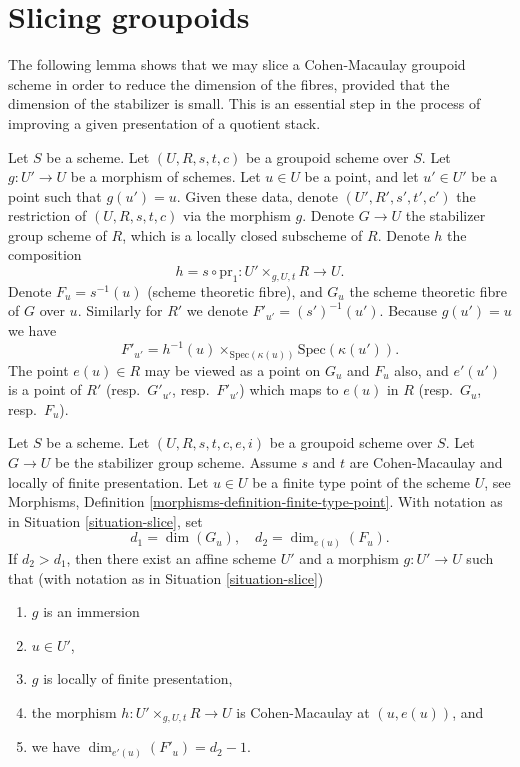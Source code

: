 \section{Slicing groupoids}
\label{section-slicing}

\noindent
The following lemma shows that we may slice a Cohen-Macaulay groupoid scheme
in order to reduce the dimension of the fibres, provided that the
dimension of the stabilizer is small. This is an essential step in
the process of improving a given presentation of a quotient stack.

\begin{situation}
\label{situation-slice}
Let $S$ be a scheme.
Let $(U, R, s, t, c)$ be a groupoid scheme over $S$.
Let $g : U' \to U$ be a morphism of schemes.
Let $u \in U$ be a point, and let $u' \in U'$ be a point such that
$g(u') = u$. Given these data, denote $(U', R', s', t', c')$
the restriction of $(U, R, s, t, c)$ via the morphism $g$.
Denote $G \to U$ the stabilizer group scheme of $R$, which
is a locally closed subscheme of $R$.
Denote $h$ the composition
$$
h = s \circ \text{pr}_1 : U' \times_{g, U, t} R \longrightarrow U.
$$
Denote $F_u = s^{-1}(u)$ (scheme theoretic fibre), and $G_u$ the
scheme theoretic fibre of $G$ over $u$.
Similarly for $R'$ we denote $F'_{u'} = (s')^{-1}(u')$.
Because $g(u') = u$ we have
$$
F'_{u'} = h^{-1}(u) \times_{\text{Spec}(\kappa(u))} \text{Spec}(\kappa(u')).
$$
The point $e(u) \in R$ may be viewed as a point on $G_u$ and $F_u$ also, and
$e'(u')$ is a point of $R'$ (resp.\ $G'_{u'}$, resp.\ $F'_{u'}$) which maps
to $e(u)$ in $R$ (resp.\ $G_u$, resp.\ $F_u$).
\end{situation}

\begin{lemma}
\label{lemma-slice}
Let $S$ be a scheme.
Let $(U, R, s, t, c, e, i)$ be a groupoid scheme over $S$.
Let $G \to U$ be the stabilizer group scheme.
Assume $s$ and $t$ are Cohen-Macaulay and locally of finite presentation.
Let $u \in U$ be a finite type point of the scheme $U$, see
Morphisms, Definition \ref{morphisms-definition-finite-type-point}.
With notation as in
Situation \ref{situation-slice},
set
$$
d_1 = \dim(G_u),\quad
d_2 = \dim_{e(u)}(F_u).
$$
If $d_2 > d_1$, then there exist an affine scheme $U'$
and a morphism $g : U' \to U$ such that (with notation as in
Situation \ref{situation-slice})
\begin{enumerate}
\item $g$ is an immersion
\item $u \in U'$,
\item $g$ is locally of finite presentation,
\item the morphism $h : U' \times_{g, U, t} R \longrightarrow U$
is Cohen-Macaulay at $(u, e(u))$, and
\item we have $\dim_{e'(u)}(F'_u) = d_2 - 1$.
\end{enumerate}
\end{lemma}

